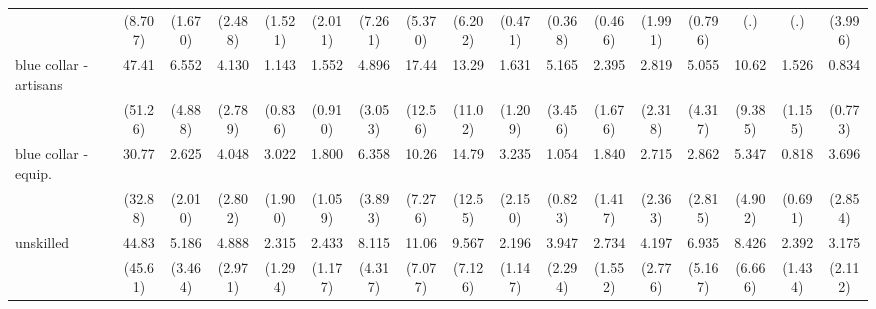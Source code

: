 {\begin{tabular}{l*{16}{c}}
                    &     (8.707)         &     (1.670)         &     (2.488)         &     (1.521)         &     (2.011)         &     (7.261)         &     (5.370)         &     (6.202)         &     (0.471)         &     (0.368)         &     (0.466)         &     (1.991)         &     (0.796)         &         (.)         &         (.)         &     (3.996)         \\
[1em]
blue collar - artisans&       47.41\sym{***}&       6.552\sym{*}  &       4.130\sym{*}  &       1.143         &       1.552         &       4.896\sym{*}  &       17.44\sym{***}&       13.29\sym{**} &       1.631         &       5.165\sym{*}  &       2.395         &       2.819         &       5.055         &       10.62\sym{**} &       1.526         &       0.834         \\
                    &     (51.26)         &     (4.888)         &     (2.789)         &     (0.836)         &     (0.910)         &     (3.053)         &     (12.56)         &     (11.02)         &     (1.209)         &     (3.456)         &     (1.676)         &     (2.318)         &     (4.317)         &     (9.385)         &     (1.155)         &     (0.773)         \\
[1em]
blue collar - equip.&       30.77\sym{**} &       2.625         &       4.048\sym{*}  &       3.022         &       1.800         &       6.358\sym{**} &       10.26\sym{**} &       14.79\sym{**} &       3.235         &       1.054         &       1.840         &       2.715         &       2.862         &       5.347         &       0.818         &       3.696         \\
                    &     (32.88)         &     (2.010)         &     (2.802)         &     (1.900)         &     (1.059)         &     (3.893)         &     (7.276)         &     (12.55)         &     (2.150)         &     (0.823)         &     (1.417)         &     (2.363)         &     (2.815)         &     (4.902)         &     (0.691)         &     (2.854)         \\
[1em]
unskilled           &       44.83\sym{***}&       5.186\sym{*}  &       4.888\sym{**} &       2.315         &       2.433         &       8.115\sym{***}&       11.06\sym{***}&       9.567\sym{**} &       2.196         &       3.947\sym{*}  &       2.734         &       4.197\sym{*}  &       6.935\sym{**} &       8.426\sym{**} &       2.392         &       3.175         \\
                    &     (45.61)         &     (3.464)         &     (2.971)         &     (1.294)         &     (1.177)         &     (4.317)         &     (7.077)         &     (7.126)         &     (1.147)         &     (2.294)         &     (1.552)         &     (2.776)         &     (5.167)         &     (6.666)         &     (1.434)         &     (2.112)         \\

\end{tabular}}
